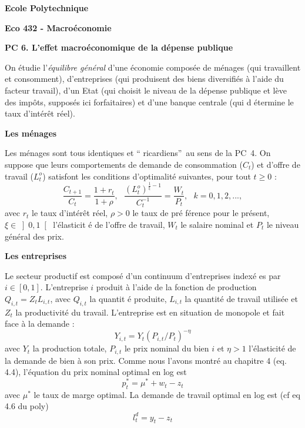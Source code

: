 \documentclass[a4paper,11pt]{article}
\begin{document}
\begin{center}
\textbf{Ecole Polytechnique}

\bigskip

\textbf{Eco 432 - Macro\'{e}conomie}

\bigskip

\textbf{PC 6. L'effet macro\'{e}conomique de la d\'{e}pense publique}
\end{center}

\bigskip

On \'{e}tudie l'\textit{\'{e}quilibre g\'{e}n\'{e}ral} d'une \'{e}conomie
compos\'{e}e de m\'{e}nages (qui travaillent et consomment), d'entreprises
(qui produisent des biens diversifi\'{e}s \`{a} l'aide du facteur travail),
d'un Etat (qui choisit le niveau de la d\'{e}pense publique et l\`{e}ve des
imp\^{o}ts, suppos\'{e}s ici forfaitaires) et d'une banque centrale (qui d%
\'{e}termine le taux d'int\'{e}r\^{e}t r\'{e}el).

\bigskip

\noindent \textbf{Les m\'{e}nages}

Les m\'{e}nages sont tous identiques et \textquotedblleft
ricardiens\textquotedblright\ au sens de la PC\ 4. On suppose que leurs
comportements de demande de consommation ($C_{t}$) et d'offre de travail ($%
L_{t}^{o}$) satisfont les conditions d'optimalit\'{e} suivantes, pour tout $%
t\geq 0$ : 
\begin{equation*}
\frac{C_{t+1}}{C_{t}}=\frac{1+r_{t}}{1+\rho },\ \ \ \frac{\left(
L_{t}^{o}\right) ^{\frac{1}{\xi }-1}}{C_{t}^{-1}}=\frac{W_{t}}{P_{t}},\ \ \
k=0,1,2,...,
\end{equation*}%
avec $r_{t}$ le taux d'int\'{e}r\^{e}t r\'{e}el, $\rho >0$ le taux de pr\'{e}%
f\'{e}rence pour le pr\'{e}sent, $\xi \in \left] 0,1\right[ $ l'\'{e}lasticit%
\'{e} de l'offre de travail, $W_{t}$ le salaire nominal et $P_{t}$ le niveau
g\'{e}n\'{e}ral des prix.

\bigskip

\noindent \textbf{Les entreprises}

Le secteur productif est compos\'{e} d'un continuum d'entreprises index\'{e}%
es par $i\in \left[ 0,1\right] $. L'entreprise $i$ produit \`{a} l'aide de
la fonction de production $Q_{i,t}=Z_{t}L_{i,t}$, avec $Q_{i,t}$ la quantit%
\'{e} produite, $L_{i,t}$ la quantit\'{e} de travail utilis\'{e}e et $Z_{t}$
la productivit\'{e} du travail. L'entreprise est en situation de monopole et
fait face \`{a} la demande :%
\begin{equation*}
Y_{i,t}=Y_{t}\left( P_{i,t}/P_{t}\right) ^{-\eta }
\end{equation*}%
avec $Y_{t}$ la production totale, $P_{i,t}$ le prix nominal du bien $i$ et $%
\eta >1$ l'\'{e}lasticit\'{e} de la demande de bien \`{a} son prix. Comme nous l'avons montr\'{e} au chapitre 4 (eq. 4.4), l'\'{e}quation du prix nominal optimal en log est 
\begin{equation*}
p^{\ast}_{t}=\mu^{\ast} +w_t-z_t
\end{equation*}%
avec $\mu^{\ast}$ le taux de marge optimal. La demande de travail optimal en log est (cf eq 4.6 du poly)
\begin{equation*}
l_{t}^{d}=y_{t}-z_{t}
\end{equation*} 
\end{document}
